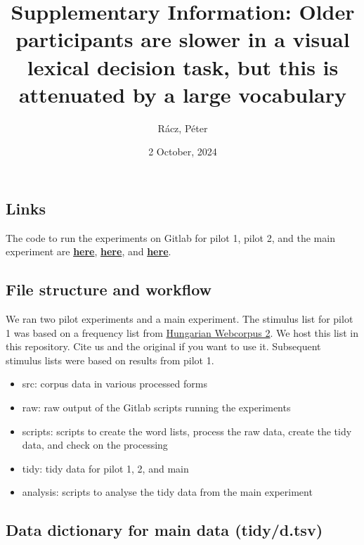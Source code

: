 \documentclass[
]{article}
\title{Supplementary Information: Older participants are slower in a
visual lexical decision task, but this is attenuated by a large
vocabulary}
\author{Rácz, Péter}
\date{2 October, 2024}
\providecommand{\tightlist}{%
  \setlength{\itemsep}{0pt}\setlength{\parskip}{0pt}}
\begin{document}
\maketitle

\subsection{Links}\label{links}

The code to run the experiments on Gitlab for pilot 1, pilot 2, and the
main experiment are
\href{https://gitlab.pavlovia.org/petyaraczbme/lex_span4}{\textbf{here}},
\href{https://gitlab.pavlovia.org/petyaraczbme/lendulet_bme_szokiserlet_vegso}{\textbf{here}},
and
\href{https://gitlab.pavlovia.org/petyaraczbme/lex-dec-task-random}{\textbf{here}}.

\subsection{File structure and
workflow}\label{file-structure-and-workflow}

We ran two pilot experiments and a main experiment. The stimulus list
for pilot 1 was based on a frequency list from
\href{https://hlt.bme.hu/en/resources/webcorpus2}{Hungarian Webcorpus
2}. We host this list in this repository. Cite us and the original if
you want to use it. Subsequent stimulus lists were based on results from
pilot 1.

\begin{itemize}
\tightlist
\item
  src: corpus data in various processed forms
\item
  raw: raw output of the Gitlab scripts running the experiments
\item
  scripts: scripts to create the word lists, process the raw data,
  create the tidy data, and check on the processing
\item
  tidy: tidy data for pilot 1, 2, and main
\item
  analysis: scripts to analyse the tidy data from the main experiment
\end{itemize}

\subsection{Data dictionary for main data
(tidy/d.tsv)}\label{data-dictionary-for-main-data-tidyd.tsv}
\end{document}
